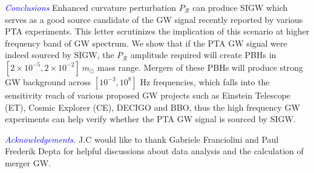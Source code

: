 \documentclass[aps, 10pt, preprintnumbers, prd, amsmath, amssymb,twocolumn, notitlepage, nofootinbib]{revtex4} %
\newcommand{\fbh}{f_{\r{bh}}}
\newcommand{\ps}{P_{\mathcal{R}}}
\def\r{\right)}
\newcommand{\ck}[1]{\textcolor{blue}{#1}}
\DeclareRobustCommand{\r}[1]{{\rm #1}}
\begin{document}
%

\ck{\it Conclusions}
Enhanced curvature perturbation $\ps$ can produce SIGW which serves as a good source candidate of 
the GW signal recently reported by various PTA experiments.
This letter scrutinizes the implication of this scenario at higher frequency band of GW spectrum.
We show that if the PTA GW signal were indeed sourced by SIGW,
the $\ps$ amplitude required will create PBHs in $[2 \times 10^{-5}, 2 \times 10^{-2}]\ m_\odot$ mass range.
Mergers of these PBHs will produce strong GW background across $[10^{-3}, 10^8]$ Hz frequencies,
which falls into the sensitivity reach of various proposed GW projects such as Einstein Telescope (ET),
Cosmic Explorer (CE),
DECIGO and BBO,
thus the high frequency GW experiments can help verify whether the PTA GW signal is sourced by SIGW.

\bigskip

\ck{\it Acknowledgements.}
J.C would like to thank Gabriele Franciolini and Paul Frederik Depta for helpful discussions about data analysis and the calculation of merger GW.
\end{document}
